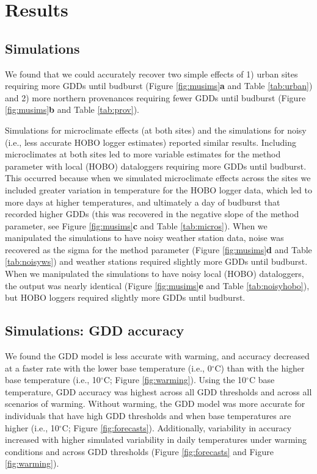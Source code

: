 \documentclass{article}\usepackage[]{graphicx}\usepackage[]{color}
\begin{document}
\section{Results}
\subsection{Simulations}
We found that we could accurately recover two simple effects of 1) urban sites requiring more GDDs until budburst (Figure \ref{fig:musims}\textbf{a} and Table \ref{tab:urban}) and 2) more northern provenances requiring fewer GDDs until budburst (Figure \ref{fig:musims}\textbf{b} and Table \ref{tab:prov}). 

Simulations for microclimate effects (at both sites) and the simulations for noisy (i.e., less accurate HOBO logger estimates) reported similar results.  Including microclimates at both sites led to more variable estimates for the method parameter with local (HOBO) dataloggers requiring more GDDs until budburst. This occurred because when we simulated microclimate effects across the sites we included greater variation in temperature for the HOBO logger data, which led to more days at higher temperatures, and ultimately a day of budburst that recorded higher GDDs (this was recovered in the negative slope of the method parameter, see Figure \ref{fig:musims}\textbf{c} and Table \ref{tab:micros}). When we manipulated the simulations to have noisy weather station data, noise was recovered as the sigma for the method parameter (Figure \ref{fig:musims}\textbf{d} and Table \ref{tab:noisyws}) and weather stations required slightly more GDDs until budburst. When we manipulated the simulations to have noisy local (HOBO) dataloggers, the output was nearly identical (Figure \ref{fig:musims}\textbf{e} and Table \ref{tab:noisyhobo}), but HOBO loggers required slightly more GDDs until budburst. 
  
\subsection{Simulations: GDD accuracy}
We found the GDD model is less accurate with warming, and accuracy decreased at a faster rate with the lower base temperature (i.e., 0$^{\circ}$C) than with the higher base temperature (i.e., 10$^{\circ}$C; Figure \ref{fig:warming}). Using the 10$^{\circ}$C base temperature, GDD accuracy was highest across all GDD thresholds and across all scenarios of warming. Without warming, the GDD model was more accurate for individuals that have high GDD thresholds and when base temperatures are higher (i.e., 10$^{\circ}$C; Figure \ref{fig:forecasts}). Additionally, variability in accuracy increased with higher simulated variability in daily temperatures under warming conditions and across GDD thresholds (Figure \ref{fig:forecasts} and Figure \ref{fig:warming}).
\end{document}
